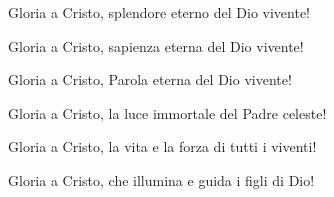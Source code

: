 
\strofa Gloria a Cristo, splendore eterno del Dio vivente!

\spazio


\spazio

\strofa Gloria a Cristo, sapienza eterna del Dio vivente!

\spazio


\spazio

\strofa Gloria a Cristo, Parola eterna del Dio vivente!

\spazio


\spazio

\strofa Gloria a Cristo, la luce immortale del Padre celeste!

\spazio


\spazio

\strofa Gloria a Cristo, la vita e la forza di tutti i viventi!

\spazio


\spazio

\strofa Gloria a Cristo, che illumina e guida i figli di Dio!

\spazio

